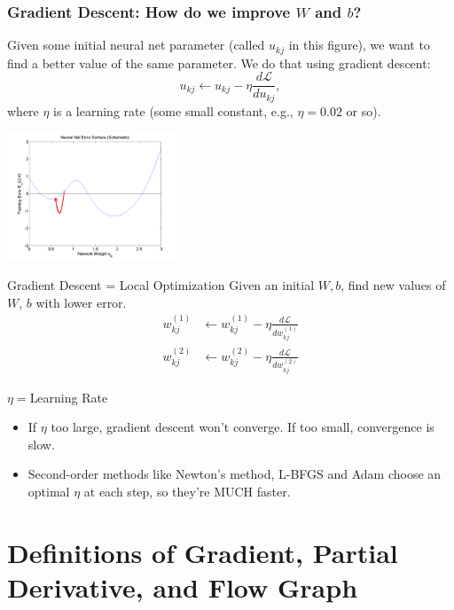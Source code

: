 \documentclass{beamer}
\begin{document}
\begin{frame}
  \frametitle{Gradient Descent: How do we improve $W$ and $b$?}  Given
  some initial neural net parameter (called $u_{kj}$ in this figure),
  we want to find a better value of the same parameter.  We do that
  using gradient descent:
  \[
  u_{kj} \leftarrow u_{kj}-\eta\frac{d{\mathcal L}}{du_{kj}},
  \]
  where $\eta$ is a learning rate (some small constant, e.g., $\eta=0.02$ or so).
  \centerline{\includegraphics[width=2in]{figs/nn_errorsurf1.png}}
\end{frame}

\begin{frame}
\begin{block}{Gradient Descent = Local Optimization}
  Given an initial $W,b$, find new values of $W$, $b$ with lower error.
  \begin{align*}
    w_{kj}^{(1)} &\leftarrow w_{kj}^{(1)}-\eta\frac{d{\mathcal L}}{d w_{kj}^{(1)}}\\
    w_{kj}^{(2)} &\leftarrow w_{kj}^{(2)}-\eta\frac{d{\mathcal L}}{d w_{kj}^{(2)}}
  \end{align*}
\end{block}
\begin{block}{$\eta=$Learning Rate}
    \begin{itemize}
      \item If $\eta$ too large, gradient descent won't converge. If
        too small, convergence is slow.
      \item Second-order methods like Newton's method, L-BFGS and Adam choose an optimal $\eta$
        at each step, so they're MUCH faster.
    \end{itemize}
\end{block}
\end{frame}

\section[Gradient]{Definitions of Gradient, Partial Derivative, and Flow Graph}
\setcounter{subsection}{1}
\end{document}
